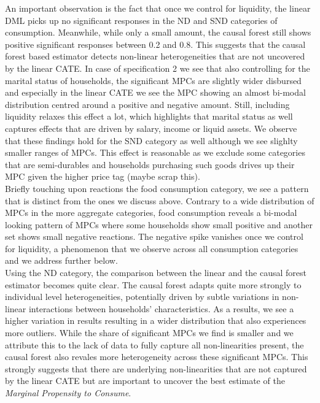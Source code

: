 An important observation is the fact that once we control for liquidity, the linear DML picks up no significant responses in the ND and SND categories of consumption. Meanwhile, while only a small amount, the causal forest still shows positive significant responses between 0.2 and 0.8. This suggests that the causal forest based estimator detects non-linear heterogeneities that are not uncovered by the linear CATE. In case of specification 2 we see that also controlling for the marital status of households, the significant MPCs are slightly wider disbursed and especially in the linear CATE we see the MPC showing an almost bi-modal distribution centred around a positive and negative amount. Still, including liquidity relaxes this effect a lot, which highlights that marital status as well captures effects that are driven by salary, income or liquid assets. We observe that these findings hold for the SND category as well although we see slighlty smaller ranges of MPCs. This effect is reasonable as we exclude some categories that are semi-durables and households purchasing such goods drives up their MPC given the higher price tag (maybe scrap this). \\ 
Briefly touching upon reactions the food consumption category, we see a pattern that is distinct from the ones we discuss above. Contrary to a wide distribution of MPCs in the more aggregate categories, food consumption reveals a bi-modal looking pattern of MPCs where some households show small positive and another set shows small negative reactions. The negative spike vanishes once we control for liquidity, a phenomenon that we observe across all consumption categories and we address further below. \\
Using the ND category, the comparison between the linear and the causal forest estimator becomes quite clear. The causal forest adapts quite more strongly to individual level heterogeneities, potentially driven by subtle variations in non-linear interactions between households' characteristics. As a results, we see a higher variation in results resulting in a wider distribution that also experiences more outliers. While the share of significant MPCs we find is smaller and we attribute this to the lack of data to fully capture all non-linearities present, the causal forest also revales more heterogeneity across these significant MPCs. This strongly suggests that there are underlying non-linearities that are not captured by the linear CATE but are important to uncover the best estimate of the \textit{Marginal Propensity to Consume}.\\
